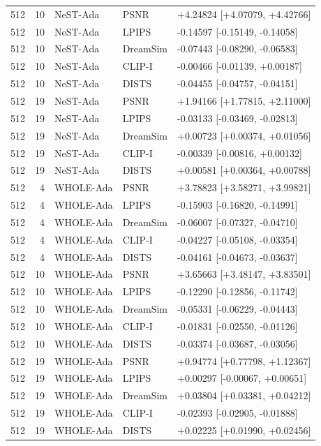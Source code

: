 \documentclass[10pt,letterpaper]{article}
\begin{document}
\begin{longtable}{@{}rrlll@{}}
512 & 10 & NeST-Ada & PSNR & +4.24824 [+4.07079, +4.42766]\\
512 & 10 & NeST-Ada & LPIPS & -0.14597 [-0.15149, -0.14058]\\
512 & 10 & NeST-Ada & DreamSim & -0.07443 [-0.08290, -0.06583]\\
512 & 10 & NeST-Ada & CLIP-I & -0.00466 [-0.01139, +0.00187]\\
512 & 10 & NeST-Ada & DISTS & -0.04455 [-0.04757, -0.04151]\\
512 & 19 & NeST-Ada & PSNR & +1.94166 [+1.77815, +2.11000]\\
512 & 19 & NeST-Ada & LPIPS & -0.03133 [-0.03469, -0.02813]\\
512 & 19 & NeST-Ada & DreamSim & +0.00723 [+0.00374, +0.01056]\\
512 & 19 & NeST-Ada & CLIP-I & -0.00339 [-0.00816, +0.00132]\\
512 & 19 & NeST-Ada & DISTS & +0.00581 [+0.00364, +0.00788]\\
512 & 4 & WHOLE-Ada & PSNR & +3.78823 [+3.58271, +3.99821]\\
512 & 4 & WHOLE-Ada & LPIPS & -0.15903 [-0.16820, -0.14991]\\
512 & 4 & WHOLE-Ada & DreamSim & -0.06007 [-0.07327, -0.04710]\\
512 & 4 & WHOLE-Ada & CLIP-I & -0.04227 [-0.05108, -0.03354]\\
512 & 4 & WHOLE-Ada & DISTS & -0.04161 [-0.04673, -0.03637]\\
512 & 10 & WHOLE-Ada & PSNR & +3.65663 [+3.48147, +3.83501]\\
512 & 10 & WHOLE-Ada & LPIPS & -0.12290 [-0.12856, -0.11742]\\
512 & 10 & WHOLE-Ada & DreamSim & -0.05331 [-0.06229, -0.04443]\\
512 & 10 & WHOLE-Ada & CLIP-I & -0.01831 [-0.02550, -0.01126]\\
512 & 10 & WHOLE-Ada & DISTS & -0.03374 [-0.03687, -0.03056]\\
512 & 19 & WHOLE-Ada & PSNR & +0.94774 [+0.77798, +1.12367]\\
512 & 19 & WHOLE-Ada & LPIPS & +0.00297 [-0.00067, +0.00651]\\
512 & 19 & WHOLE-Ada & DreamSim & +0.03804 [+0.03381, +0.04212]\\
512 & 19 & WHOLE-Ada & CLIP-I & -0.02393 [-0.02905, -0.01888]\\
512 & 19 & WHOLE-Ada & DISTS & +0.02225 [+0.01990, +0.02456]\\
\bottomrule\end{longtable}
\end{document}

